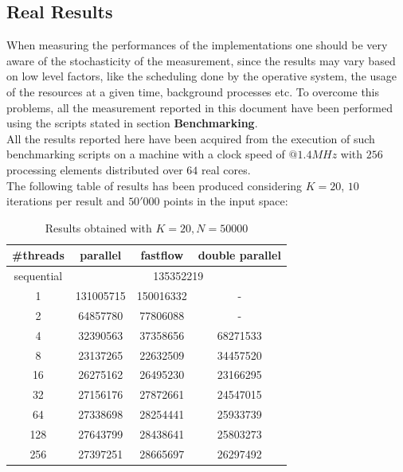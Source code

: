 \documentclass[12pt, letterpaper]{article}  %
\begin{document}
\subsection{Real Results}
When measuring the performances of the implementations one should be very aware of the stochasticity of the measurement, since the results may vary based on low level factors, like the scheduling done by the operative system, the usage of the resources at a given time, background processes etc.
To overcome this problems, all the measurement reported in this document have been performed using the scripts stated in section \textbf{Benchmarking}.\\
All the results reported here have been acquired from the execution of such benchmarking scripts on a machine with a clock speed of $@1.4 MHz$ with $256$ processing elements distributed over $64$ real cores.\\
The following table of results has been produced considering $K = 20$, $10$ iterations per result and $50'000$ points in the input space:

\begin{table}[h!]
    \centering
    \begin{tabular}{|c|c|c|c|}
        \hline
        \#threads & parallel & fastflow & double parallel \\ \hline
        sequential & \multicolumn{3}{c|}{135352219}\\ \hline
        1 & 131005715 & 150016332 & - \\ \hline
        2 & 64857780 & 77806088 & - \\ \hline
        4 & 32390563 & 37358656 & 68271533 \\ \hline
        8 & 23137265 & 22632509 & 34457520 \\ \hline
        16 & 26275162 & 26495230 & 23166295 \\ \hline
        32 & 27156176 & 27872661 & 24547015 \\ \hline
        64 & 27338698 & 28254441 & 25933739 \\ \hline
        128 & 27643799 & 28438641 & 25803273 \\ \hline
        256 & 27397251 & 28665697 & 26297492 \\ \hline
    \end{tabular}
    \caption{Results obtained with $K = 20, N = 50000$}
    \label{tab:results}
\end{table}
\end{document}

